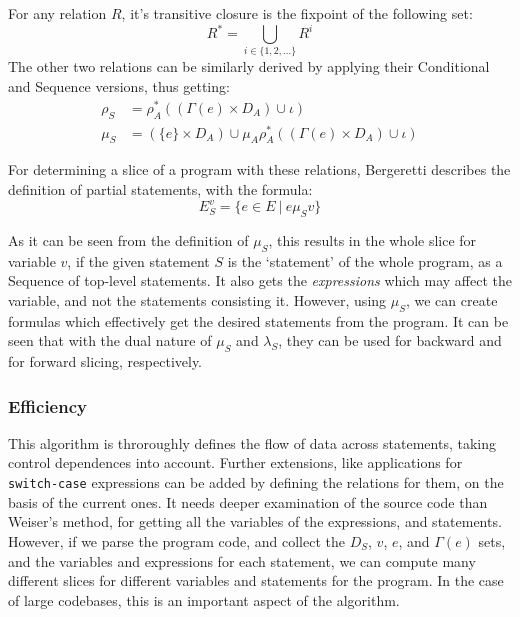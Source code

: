 \documentclass[oneside,12pt,a4paper]{book}
\begin{document}
For any relation $R$, it's transitive closure is the fixpoint of the following set:
\begin{equation}
R^* = \bigcup_{i \in \{1,2,...\}} R^i
\end{equation}
The other two relations can be similarly derived by applying their Conditional and Sequence versions, thus getting:
\begin{equation}
\begin{split}
\rho_S &= \rho^*_A((\Gamma(e) \times D_A) \cup \iota) \\
\mu_S &= (\{e\} \times D_A) \cup \mu_A\rho^*_A((\Gamma(e) \times D_A) \cup \iota)
\end{split}
\end{equation}

For determining a slice of a program with these relations, Bergeretti describes the definition of partial statements, with the formula:
\begin{equation}
E^v_S = \{e \in E\ |\ e \mu_S v\}
\end{equation}

As it can be seen from the definition of $\mu_S$, this results in the whole slice for variable $v$, if the given statement $S$ is the `statement' of the whole program, as a Sequence of top-level statements. It also gets the \textit{expressions} which may affect the variable, and not the statements consisting it. However, using $\mu_S$, we can create formulas which effectively get the desired statements from the program. It can be seen that with the dual nature of $\mu_S$ and $\lambda_S$, they can be used for backward and for forward slicing, respectively. 

\subsubsection{Efficiency}

This algorithm is throroughly defines the flow of data across statements, taking control dependences into account. Further extensions, like applications for \texttt{switch-case} expressions can be added by defining the relations for them, on the basis of the current ones. It needs deeper examination of the source code than Weiser's method, for getting all the variables of the expressions, and statements. However, if we parse the program code, and collect the $D_S$, $v$, $e$, and $\Gamma(e)$ sets, and the variables and expressions for each statement, we can compute many different slices for different variables and statements for the program. In the case of large codebases, this is an important aspect of the algorithm. 
\end{document}
